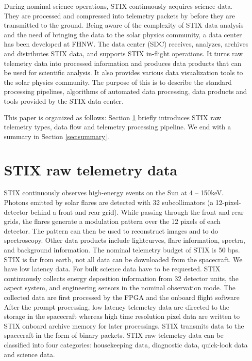 \documentclass{aa}
\begin{document}
During nominal science operations, STIX continuously acquires science data. 
They are processed and compressed into telemetry packets by
before they are transmitted to the ground.
Being aware of the complexity of STIX data analysis and 
the need of bringing the data to the solar physics community, a data center has been
developed at FHNW. The data center (SDC) receives, analyzes, archives and distributes STIX data,
 and supports STIX in-flight operations.
It turns raw telemetry data into processed information and produces data products that can be used for scientific analysis.
It also provides various data visualization tools to the solar physics community.
The purpose of this is to describe the standard processing pipelines, 
algorithms of automated data processing, data products and tools provided by the STIX data center.

This paper is organized as follows: Section \ref{sec:raw-data} briefly introduces STIX raw telemetry types, data flow and
telemetry processing pipeline. 
We end with a summary in Section \ref{sec:summary}.
\section{STIX raw telemetry data}
\label{sec:raw-data}

STIX continuously observes high-energy events on the Sun at 4 -- 150keV. 
Photons emitted by solar flares are detected with 32 subcollimators 
(a 12-pixel-detector behind a front and rear grid). While passing through the front and rear grids, 
the flares generate a modulation pattern over the 12 pixels of each detector. 
The pattern can then be used to reconstruct images and to do spectroscopy. 
Other data products include lightcurves, flare information, spectra, and background information.
The nominal telemetry budget of STIX is 50 bps.
STIX is far from earth, not all data can be downloaded from the spacecraft. We have low latency data.
For bulk science data have to be requested.
STIX continuously collects energy deposition information from 32 detector units, the aspect system,
and engineering sensors in the nominal observation mode.
The collected data are first processed by the FPGA and the onboard flight software
After the prompt processing, low latency telemetry data are directed to the
storage in the spacecraft whereas high time resolution pixel data are written to STIX onboard archive memory for
later processings.
STIX transmits data to the spacecraft in the form of binary packets.
STIX raw telemetry data can be classified into four
categories: housekeeping data, diagnostic data, quick-look data and science data.
\end{document}

